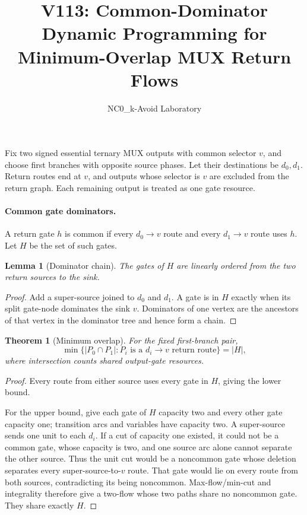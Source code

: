 \documentclass[11pt]{article}
\newtheorem{theorem}{Theorem}
\newtheorem{lemma}{Lemma}
\begin{document}
\title{V113: Common-Dominator Dynamic Programming for Minimum-Overlap MUX Return Flows}
\author{NC0\_k-Avoid Laboratory}
\date{}
\maketitle

Fix two signed essential ternary MUX outputs with common selector $v$, and choose first
branches with opposite source phases.  Let their destinations be $d_0,d_1$.  Return
routes end at $v$, and outputs whose selector is $v$ are excluded from the return graph.
Each remaining output is treated as one gate resource.

\paragraph{Common gate dominators.}
A return gate $h$ is common if every $d_0\to v$ route and every $d_1\to v$ route uses
$h$.  Let $H$ be the set of such gates.

\begin{lemma}[Dominator chain]
The gates of $H$ are linearly ordered from the two return sources to the sink.
\end{lemma}

\begin{proof}
Add a super-source joined to $d_0$ and $d_1$.  A gate is in $H$ exactly when its split
gate-node dominates the sink $v$.  Dominators of one vertex are the ancestors of that
vertex in the dominator tree and hence form a chain.
\end{proof}

\begin{theorem}[Minimum overlap]
For the fixed first-branch pair,
\[
 \min\{|P_0\cap P_1|:P_i\text{ is a }d_i\to v\text{ return route}\}=|H|,
\]
where intersection counts shared output-gate resources.
\end{theorem}

\begin{proof}
Every route from either source uses every gate in $H$, giving the lower bound.

For the upper bound, give each gate of $H$ capacity two and every other gate capacity
one; transition arcs and variables have capacity two.  A super-source sends one unit to
each $d_i$.  If a cut of capacity one existed, it could not be a common gate, whose
capacity is two, and one source arc alone cannot separate the other source.  Thus the
unit cut would be a noncommon gate whose deletion separates every super-source-to-$v$
route.  That gate would lie on every route from both sources, contradicting its being
noncommon.  Max-flow/min-cut and integrality therefore give a two-flow whose two paths
share no noncommon gate.  They share exactly $H$.
\end{proof}
\end{document}
